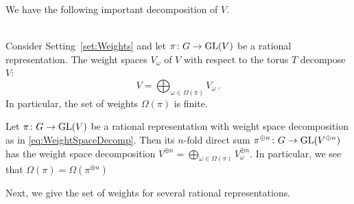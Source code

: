 We have the following important decomposition of $V$.

\begin{theorem}
	\label{thm:WeightSpaceDecomposition} 
	\ \\
	Consider Setting~\ref{set:Weights} and let $\pi \colon G \to \operatorname{GL}(V)$ be a rational representation. The weight spaces $V_{\omega}$ of $V$ with respect to the torus $T$ decompose $V$:
		\begin{equation}\label{eq:WeightSpaceDecomp}
			V = \bigoplus_{\omega \in \Omega(\pi)} V_\omega \, .
		\end{equation}
	In particular, the set of weights $\Omega(\pi)$ is finite.
\end{theorem}

\begin{remark}\label{rem:WeightsNfoldDirectSum}
	Let $\pi \colon G \to \operatorname{GL}(V)$ be a rational representation with weight space decomposition as in \eqref{eq:WeightSpaceDecomp}.
	Then its $n$-fold direct sum $\pi^{\oplus n} \colon G \to \operatorname{GL}(V^{\oplus n})$ has the weight space decomposition 
		$V^{\oplus n} = \bigoplus_{\omega \in \Omega(\pi)} V_\omega^{\oplus n} . $
	In particular, we see that $\Omega(\pi) = \Omega(\pi^{\oplus n})$
	\hfill\remSymbol
\end{remark}

Next, we give the set of weights for several rational representations.

